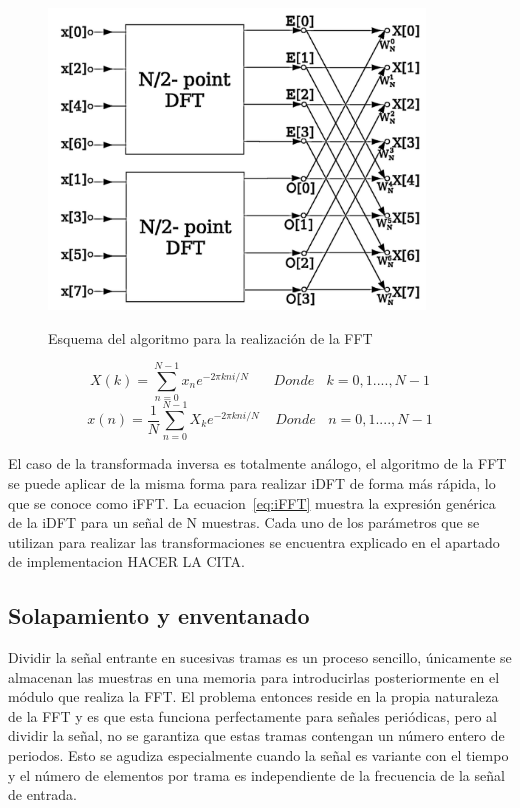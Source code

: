 \begin{figure}[!ht]
\begin{center}
\label{fig:fft}
\includegraphics[width=10cm]{img/dft.png}
\caption{Esquema del algoritmo para la realización de la FFT}
\end{center}
\end{figure}

\begin{equation}
\label{eq:FFT}
X(k) =  \sum_{n = 0}^{N - 1} x_{n}e^{-2\pi kni/N}~~~~~~~~Donde~~~~k = 0, 1...., N-1
\end{equation}
\begin{equation}
\label{eq:iFFT}
x(n) = \frac{1}{N} \sum_{n = 0}^{N - 1} X_{k}e^{-2\pi kni/N}~~~~~Donde~~~~n = 0, 1...., N-1
\end{equation}

El caso de la transformada inversa es totalmente análogo, el algoritmo de la FFT se puede aplicar de la misma forma para realizar iDFT de forma más rápida, lo que se conoce como iFFT. La ecuacion~\ref{eq:iFFT} muestra la expresión genérica de la iDFT para un señal de N muestras. Cada uno de los parámetros que se utilizan para realizar las transformaciones se encuentra explicado en el apartado de implementacion HACER LA CITA.

\subsection{Solapamiento y enventanado}

Dividir la señal entrante en sucesivas tramas es un proceso sencillo, únicamente se almacenan las muestras en una memoria para introducirlas posteriormente en el módulo que realiza la FFT. El problema entonces reside en la propia naturaleza de la FFT y es que esta funciona perfectamente para señales periódicas, pero al dividir la señal, no se garantiza que estas tramas contengan un número entero de periodos. Esto se agudiza especialmente cuando la señal es variante con el tiempo y el número de elementos por trama es independiente de la frecuencia de la señal de entrada.

